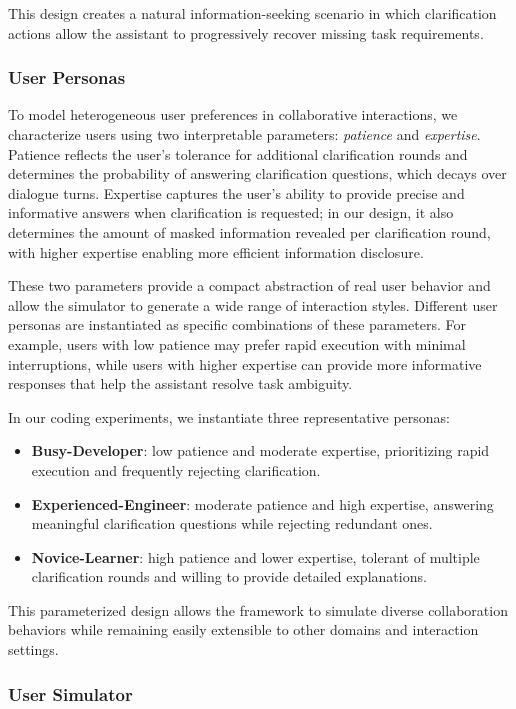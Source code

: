 This design creates a natural information-seeking scenario in which clarification actions allow the assistant to progressively recover missing task requirements.

\subsubsection{User Personas}

To model heterogeneous user preferences in collaborative interactions, we characterize users using two interpretable parameters: \textit{patience} and \textit{expertise}. 
Patience reflects the user's tolerance for additional clarification rounds and determines the probability of answering clarification questions, which decays over dialogue turns. 
Expertise captures the user's ability to provide precise and informative answers when clarification is requested; in our design, it also determines the amount of masked information revealed per clarification round, with higher expertise enabling more efficient information disclosure.

These two parameters provide a compact abstraction of real user behavior and allow the simulator to generate a wide range of interaction styles.
Different user personas are instantiated as specific combinations of these parameters. 
For example, users with low patience may prefer rapid execution with minimal interruptions, while users with higher expertise can provide more informative responses that help the assistant resolve task ambiguity. 

In our coding experiments, we instantiate three representative personas:
\begin{itemize}
\item \textbf{Busy-Developer}: low patience and moderate expertise, prioritizing rapid execution and frequently rejecting clarification.
\item \textbf{Experienced-Engineer}: moderate patience and high expertise, answering meaningful clarification questions while rejecting redundant ones.
\item \textbf{Novice-Learner}: high patience and lower expertise, tolerant of multiple clarification rounds and willing to provide detailed explanations.
\end{itemize}
This parameterized design allows the framework to simulate diverse collaboration behaviors while remaining easily extensible to other domains and interaction settings.

\subsubsection{User Simulator}

